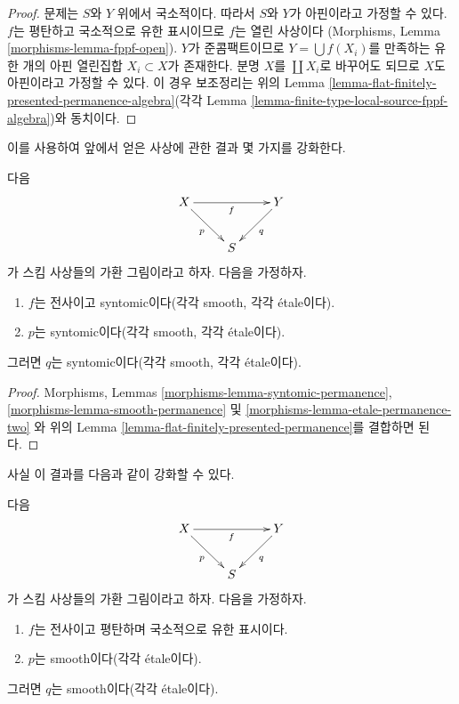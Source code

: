 \begin{proof}
문제는 $S$와 $Y$ 위에서 국소적이다. 따라서 $S$와 $Y$가 아핀이라고
가정할 수 있다. $f$는 평탄하고 국소적으로 유한 표시이므로 $f$는 열린 사상이다
(Morphisms, Lemma \ref{morphisms-lemma-fppf-open}). $Y$가 준콤팩트이므로
$Y = \bigcup f(X_i)$를 만족하는 유한 개의 아핀 열린집합 $X_i \subset X$가
존재한다. 분명 $X$를 $\coprod X_i$로 바꾸어도 되므로 $X$도 아핀이라고
가정할 수 있다. 이 경우 보조정리는 위의 Lemma
\ref{lemma-flat-finitely-presented-permanence-algebra}(각각 Lemma
\ref{lemma-finite-type-local-source-fppf-algebra})와 동치이다.
\end{proof}

\noindent
이를 사용하여 앞에서 얻은 사상에 관한 결과 몇 가지를 강화한다.

\begin{lemma}
\label{lemma-syntomic-smooth-etale-permanence}
다음
$$
\xymatrix{
X \ar[rr]_f \ar[rd]_p & &
Y \ar[dl]^q \\
& S
}
$$
가 스킴 사상들의 가환 그림이라고 하자. 다음을 가정하자.
\begin{enumerate}
\item $f$는 전사이고 syntomic이다(각각 smooth, 각각 \'etale이다).
\item $p$는 syntomic이다(각각 smooth, 각각 \'etale이다).
\end{enumerate}
그러면 $q$는 syntomic이다(각각 smooth, 각각 \'etale이다).
\end{lemma}

\begin{proof}
Morphisms, Lemmas
\ref{morphisms-lemma-syntomic-permanence},
\ref{morphisms-lemma-smooth-permanence} 및
\ref{morphisms-lemma-etale-permanence-two}
와 위의 Lemma \ref{lemma-flat-finitely-presented-permanence}를 결합하면 된다.
\end{proof}

\noindent
사실 이 결과를 다음과 같이 강화할 수 있다.

\begin{lemma}
\label{lemma-smooth-permanence}
다음
$$
\xymatrix{
X \ar[rr]_f \ar[rd]_p & &
Y \ar[dl]^q \\
& S
}
$$
가 스킴 사상들의 가환 그림이라고 하자. 다음을 가정하자.
\begin{enumerate}
\item $f$는 전사이고 평탄하며 국소적으로 유한 표시이다.
\item $p$는 smooth이다(각각 \'etale이다).
\end{enumerate}
그러면 $q$는 smooth이다(각각 \'etale이다).
\end{lemma}

